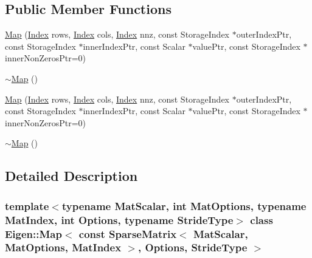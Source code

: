 \subsection*{Public Member Functions}
\begin{DoxyCompactItemize}
\item 
\hyperlink{class_eigen_1_1_map_3_01const_01_sparse_matrix_3_01_mat_scalar_00_01_mat_options_00_01_mat_index4032bba20cf92aab8bcf07e926e15a4f_a8075e61ba51d1aa5858b0163e80eca8b}{Map} (\hyperlink{namespace_eigen_a62e77e0933482dafde8fe197d9a2cfde}{Index} rows, \hyperlink{namespace_eigen_a62e77e0933482dafde8fe197d9a2cfde}{Index} cols, \hyperlink{namespace_eigen_a62e77e0933482dafde8fe197d9a2cfde}{Index} nnz, const Storage\+Index $\ast$outer\+Index\+Ptr, const Storage\+Index $\ast$inner\+Index\+Ptr, const Scalar $\ast$value\+Ptr, const Storage\+Index $\ast$inner\+Non\+Zeros\+Ptr=0)
\item 
\hyperlink{class_eigen_1_1_map_3_01const_01_sparse_matrix_3_01_mat_scalar_00_01_mat_options_00_01_mat_index4032bba20cf92aab8bcf07e926e15a4f_aa4b0d0dd528fef0e1f8ce8c043d42b21}{$\sim$\+Map} ()
\item 
\hyperlink{class_eigen_1_1_map_3_01const_01_sparse_matrix_3_01_mat_scalar_00_01_mat_options_00_01_mat_index4032bba20cf92aab8bcf07e926e15a4f_a8075e61ba51d1aa5858b0163e80eca8b}{Map} (\hyperlink{namespace_eigen_a62e77e0933482dafde8fe197d9a2cfde}{Index} rows, \hyperlink{namespace_eigen_a62e77e0933482dafde8fe197d9a2cfde}{Index} cols, \hyperlink{namespace_eigen_a62e77e0933482dafde8fe197d9a2cfde}{Index} nnz, const Storage\+Index $\ast$outer\+Index\+Ptr, const Storage\+Index $\ast$inner\+Index\+Ptr, const Scalar $\ast$value\+Ptr, const Storage\+Index $\ast$inner\+Non\+Zeros\+Ptr=0)
\item 
\hyperlink{class_eigen_1_1_map_3_01const_01_sparse_matrix_3_01_mat_scalar_00_01_mat_options_00_01_mat_index4032bba20cf92aab8bcf07e926e15a4f_aa4b0d0dd528fef0e1f8ce8c043d42b21}{$\sim$\+Map} ()
\end{DoxyCompactItemize}


\subsection{Detailed Description}
\subsubsection*{template$<$typename Mat\+Scalar, int Mat\+Options, typename Mat\+Index, int Options, typename Stride\+Type$>$\newline
class Eigen\+::\+Map$<$ const Sparse\+Matrix$<$ Mat\+Scalar, Mat\+Options, Mat\+Index $>$, Options, Stride\+Type $>$}



